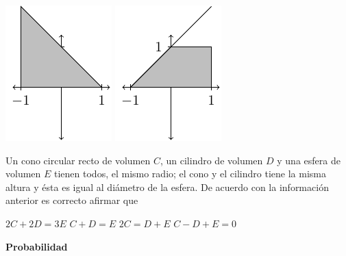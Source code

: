 \documentclass[10pt,letterpaper,addpoints]{exam}
\begin{document}
\begin{multicols}{2}
\begin{questions}
\begin{choices}
\begin{multicols}{2}
\choice \includegraphics[scale=.75]{Images/desigC.pdf} 
\choice \includegraphics[scale=.75]{Images/desigD.pdf} 
\end{multicols}
\end{choices}
\question Un cono circular recto de volumen $C$, un cilindro de volumen $D$ y una esfera de volumen $E$ tienen todos, el mismo radio; el cono y el cilindro tiene la misma altura y ésta es igual al diámetro de la esfera. De acuerdo con la información anterior es correcto afirmar que
\begin{choices}
  \choice $ 2C+2D=3E $
  \choice $ C+D=E $
  \choice $ 2C=D+E $
  \CorrectChoice $ C-D+E=0 $
\end{choices}

\large \textbf{Probabilidad}


\end{questions}
\end{multicols}
\end{document}
